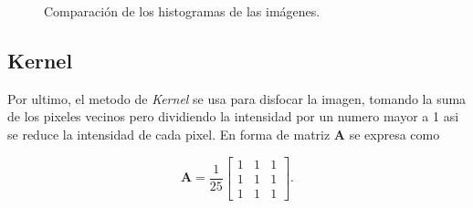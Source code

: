\begin{figure}[H]
	\centering
	\caption{Comparación de los histogramas de las imágenes\label{fig:sharpenhist}.}
\end{figure}	

\subsection{Kernel}

Por ultimo, el metodo de \textit{Kernel} se usa para disfocar la imagen, tomando la suma de los pixeles vecinos pero dividiendo la intensidad por un numero mayor a 1 asi se reduce la intensidad de cada pixel. En forma de matriz \textbf{A} se expresa como 

 \begin{equation}
\textbf{A}=\frac{1}{25}\begin{bmatrix}
1 &1 &1\\
1 &1 &1\\
1 &1 &1
\end{bmatrix}.
\end{equation}

